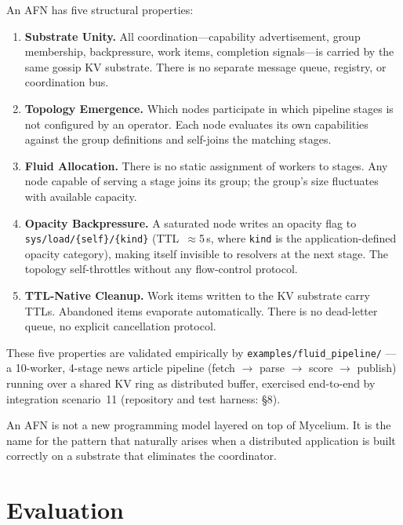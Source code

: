 \documentclass[11pt]{article}
\begin{document}
An AFN has five structural properties:

\begin{enumerate}
\item \textbf{Substrate Unity.} All coordination---capability advertisement, group
  membership, backpressure, work items, completion signals---is carried by the same
  gossip KV substrate. There is no separate message queue, registry, or coordination bus.

\item \textbf{Topology Emergence.} Which nodes participate in which pipeline stages
  is not configured by an operator. Each node evaluates its own capabilities against
  the group definitions and self-joins the matching stages.

\item \textbf{Fluid Allocation.} There is no static assignment of workers to
  stages. Any node capable of serving a stage joins its group; the group's size
  fluctuates with available capacity.

\item \textbf{Opacity Backpressure.} A saturated node writes an opacity flag to
  \texttt{sys/load/\{self\}/\{kind\}} (TTL~$\approx$5\,s, where \texttt{kind} is
  the application-defined opacity category), making itself invisible to resolvers
  at the next stage. The topology self-throttles without any flow-control protocol.

\item \textbf{TTL-Native Cleanup.} Work items written to the KV substrate carry
  TTLs. Abandoned items evaporate automatically. There is no dead-letter queue, no
  explicit cancellation protocol.
\end{enumerate}

These five properties are validated empirically by \texttt{examples/fluid\_pipeline/}
---a 10-worker, 4-stage news article pipeline (fetch $\to$ parse $\to$ score $\to$
publish) running over a shared KV ring as distributed buffer, exercised end-to-end
by integration scenario~11 (repository and test harness: \S8).

An AFN is not a new programming model layered on top of Mycelium. It is the name
for the pattern that naturally arises when a distributed application is built
correctly on a substrate that eliminates the coordinator.

\section{Evaluation}
\end{document}
